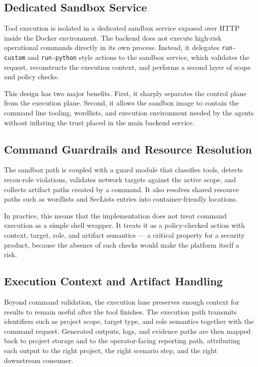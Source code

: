 \documentclass[12pt,a4paper]{report}
\begin{document}
\subsection{Dedicated Sandbox Service}

Tool execution is isolated in a dedicated sandbox service exposed over HTTP inside
the Docker environment. The backend does not execute high-risk operational commands
directly in its own process. Instead, it delegates \texttt{run-custom} and
\texttt{run-python} style actions to the sandbox service, which validates the
request, reconstructs the execution context, and performs a second layer of scope
and policy checks.

This design has two major benefits. First, it sharply separates the control plane
from the execution plane. Second, it allows the sandbox image to contain the command
line tooling, wordlists, and execution environment needed by the agents without
inflating the trust placed in the main backend service.

\subsection{Command Guardrails and Resource Resolution}

The sandbox path is coupled with a guard module that classifies tools, detects
recon-role violations, validates network targets against the active scope, and
collects artifact paths created by a command. It also resolves shared resource paths
such as wordlists and SecLists entries into container-friendly locations.

In practice, this means that the implementation does not treat command execution as a
simple shell wrapper. It treats it as a policy-checked action with context, target,
role, and artifact semantics --- a critical property for a security product, because
the absence of such checks would make the platform itself a risk.

\subsection{Execution Context and Artifact Handling}

Beyond command validation, the execution lane preserves enough context for results to
remain useful after the tool finishes. The execution path transmits identifiers such
as project scope, target type, and role semantics together with the command request.
Generated outputs, logs, and evidence paths are then mapped back to project storage
and to the operator-facing reporting path, attributing each output to the right
project, the right scenario step, and the right downstream consumer.
\end{document}
